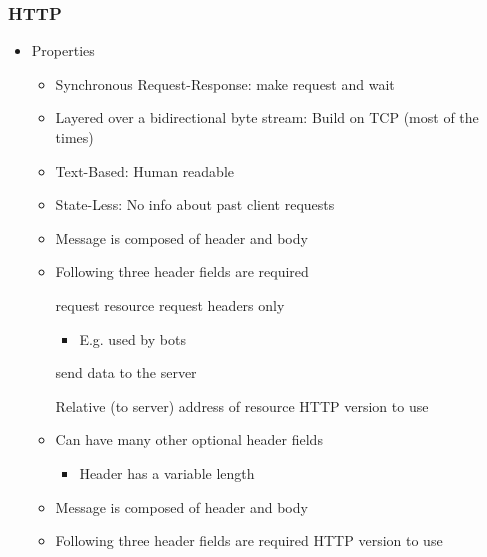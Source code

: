 \subsubsection{HTTP}
\begin{itemize}
    \ipro Simple
    \item Properties
        \begin{itemize}
            \item Synchronous Request-Response: make request and wait
            \item Layered over a bidirectional byte stream: Build on TCP (most of the times)
            \item Text-Based: Human readable
            \item State-Less: No info about past client requests
        \end{itemize}
        \begin{itemize}
            \item Message is composed of header and body
            \item Following three header fields are required
                \begin{itemize}
                     request resource
                     request headers only
                        \begin{itemize}
                            \item E.g. used by bots
                        \end{itemize}
                     send data to the server
                \end{itemize}
             Relative (to server) address of resource
             HTTP version to use
            \item Can have many other optional header fields
                \begin{itemize}
                    \item Header has a variable length
                \end{itemize}
        \end{itemize}
        \begin{itemize}
            \item Message is composed of header and body
            \item Following three header fields are required
             HTTP version to use

\end{itemize}
\end{itemize}
